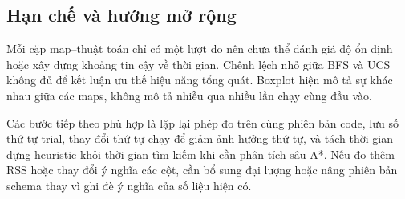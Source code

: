 \subsection{Hạn chế và hướng mở rộng}

Mỗi cặp map--thuật toán chỉ có một lượt đo nên chưa thể đánh giá độ
ổn định hoặc xây dựng khoảng tin cậy về thời gian. Chênh lệch nhỏ giữa
BFS và UCS không đủ để kết luận ưu thế hiệu năng tổng quát. Boxplot
hiện mô tả sự khác nhau giữa các maps, không mô tả nhiễu qua nhiều
lần chạy cùng đầu vào.

Các bước tiếp theo phù hợp là lặp lại phép đo trên cùng phiên bản
code, lưu số thứ tự trial, thay đổi thứ tự chạy để giảm ảnh hưởng
thứ tự, và tách thời gian dựng heuristic khỏi thời gian tìm kiếm khi
cần phân tích sâu A*. Nếu đo thêm RSS hoặc thay đổi ý nghĩa các cột,
cần bổ sung đại lượng hoặc nâng phiên bản schema thay vì ghi đè ý
nghĩa của số liệu hiện có.
\clearpage
